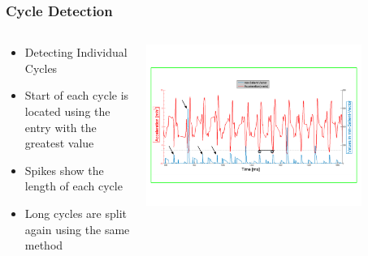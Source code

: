 \documentclass{beamer}
\begin{document}
\begin{frame}
  \frametitle{Cycle Detection}
  \begin{columns}
  \begin{column}{.5\textwidth}
  \begin{itemize}
  	\item Detecting Individual Cycles
  	\item Start of each cycle is located using the entry with the greatest value
  	\item Spikes show the length of each cycle
  	\item Long cycles are split again using the same method
  \end{itemize}
  \end{column}
    \begin{column}{0.7\textwidth}
   \includegraphics[width=0.8\textwidth]{Illustrations/svector2.png}
       \\
  \end{column}
  \end{columns}
\end{frame}
\end{document}
